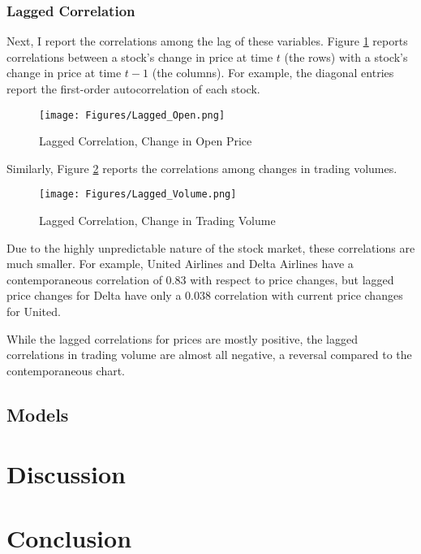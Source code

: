 \documentclass[12pt]{article}
\begin{document}
\subsubsection{Lagged Correlation}
Next, I report the correlations among the lag of these variables. Figure \ref{fig:lagged_open} reports correlations between a stock's change in price at time $t$ (the rows) with a stock's change in price at time $t-1$ (the columns). For example, the diagonal entries report the first-order autocorrelation of each stock.
\begin{figure}[H]
    \centering
    \caption{Lagged Correlation, Change in Open Price}
    \texttt{[image: Figures/Lagged\_Open.png]}
    \label{fig:lagged_open}
\end{figure}
Similarly, Figure \ref{fig:lagged_volume} reports the correlations among changes in trading volumes.
\begin{figure}[H]
    \centering
    \caption{Lagged Correlation, Change in Trading Volume}
    \texttt{[image: Figures/Lagged\_Volume.png]}
    \label{fig:lagged_volume}
\end{figure}
Due to the highly unpredictable nature of the stock market, these correlations are much smaller. For example, United Airlines and Delta Airlines have a contemporaneous correlation of 0.83 with respect to price changes, but lagged price changes for Delta have only a 0.038 correlation with current price changes for United.

While the lagged correlations for prices are mostly positive, the lagged correlations in trading volume are almost all negative, a reversal compared to the contemporaneous chart.


\subsection{Models}

\newpage
\section{Discussion}

\section{Conclusion}

\newpage
\printbibliography
\end{document}
